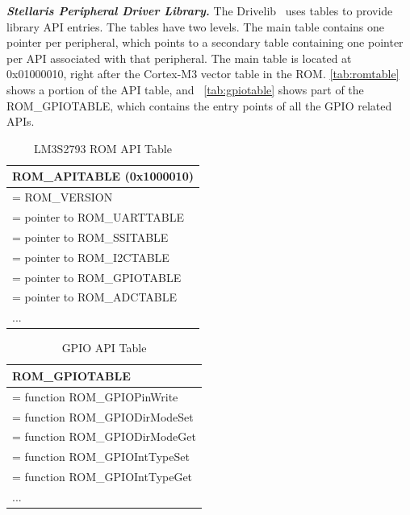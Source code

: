 \textbf{\textit{Stellaris Peripheral Driver Library.}} The Drivelib~\cite{lm3s2793rom} uses tables to provide library API entries. The tables have two levels. The main table contains one pointer per peripheral, which points to a secondary table containing one pointer per API associated with that peripheral. The main table is located at 0x01000010, right after the Cortex-M3 vector table in the ROM. \autoref{tab:romtable} shows a portion of the API table, and ~\autoref{tab:gpiotable} shows part of the ROM\_GPIOTABLE, which contains the entry points of all the GPIO related APIs.

\begin{center}
	\begin{table}
		\small
		\begin{tabular}{|p{7.2cm}|} 
			\hline
			ROM\_APITABLE (0x1000010) \\ [0.5ex] 
			\hline
			[0] = ROM\_VERSION \\
			\hline
			[1] = pointer to ROM\_UARTTABLE \\
			\hline
			[2] = pointer to ROM\_SSITABLE \\
			\hline
			[3] = pointer to ROM\_I2CTABLE \\
			\hline
			[4] = pointer to ROM\_GPIOTABLE \\
			\hline
			[5] = pointer to ROM\_ADCTABLE \\
			\hline
			... \\ 
			\hline
		\end{tabular}
		\caption{LM3S2793 ROM API Table}
		\label{tab:romtable}
	\end{table}
\end{center}

\begin{center}
	\begin{table}
		\small
		\begin{tabular}{|p{7.2cm}|} 
			\hline
			ROM\_GPIOTABLE \\ [0.5ex] 
			\hline
			[0] = function ROM\_GPIOPinWrite \\
			\hline
			[1] = function ROM\_GPIODirModeSet \\
			\hline
			[2] = function ROM\_GPIODirModeGet \\
			\hline
			[3] = function ROM\_GPIOIntTypeSet \\
			\hline
			[4] = function ROM\_GPIOIntTypeGet \\
			\hline
			... \\ 
			\hline
		\end{tabular}
		\caption{GPIO API Table}
		\label{tab:gpiotable}
	\end{table}
\end{center}


